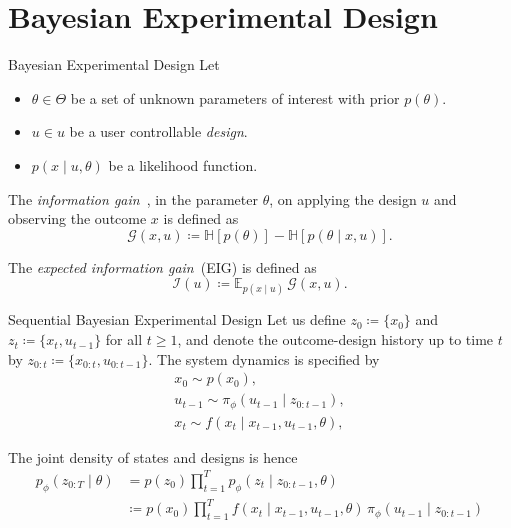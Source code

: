 \documentclass[10pt, aspectratio=1610]{beamer}
\begin{document}
    \section{Bayesian Experimental Design}
    \begin{frame}{Bayesian Experimental Design}
      Let
      \begin{itemize}
        \item $\theta \in \Theta$ be a set of unknown parameters of interest with prior $p(\theta)$.
        \item $u \in u$ be a user controllable \emph{design}.
        \item $p(x \mid u, \theta)$ be a likelihood function.
      \end{itemize}
      
      \pause
      \begin{definition}
        The \emph{information gain}~\citep[IG,][]{lindley1956measure}, in the parameter $\theta$, on applying the design $u$ and observing the outcome $x$ is defined as
        \begin{equation}\label{eq:ig_single_experiment}
          \mathcal{G}(x, u) \coloneq \mathbb{H}[p(\theta)] - \mathbb{H}[p(\theta\mid x, u)].
        \end{equation}
      \end{definition}

      \pause
      \begin{definition}
        The \emph{expected information gain}~(EIG) is defined as
        \begin{equation}
          \mathcal{I}(u) \coloneq \mathbb{E}_{p(x \mid u)} \, \mathcal{G}(x, u).
        \end{equation}
      \end{definition}
    \end{frame}

    \begin{frame}{Sequential Bayesian Experimental Design}
      Let us define $z_0 \coloneq \{x_0\}$ and $z_{t} \coloneq \{x_t, u_{t-1}\}$ for all $t \geq 1$, and denote the outcome-design history up to time $t$ by $z_{0:t} \coloneq \{x_{0:t}, u_{0:t-1}\}$. The system dynamics is specified by
      \begin{gather}
        x_0 \sim p(x_0), \\
        u_{t-1} \sim \pi_\phi(u_{t-1} \mid z_{0:t-1}), \\
        x_t \sim f(x_t \mid x_{t-1}, u_{t-1}, \theta),
      \end{gather}
      \pause

      \vspace{0.2cm}
      The joint density of states and designs is hence
      \begin{align}\label{eq:joint_density}
        p_{\phi}(z_{0:T} \mid \theta) &= p(z_{0}) \prod_{t=1}^T p_{\phi}(z_{t} \mid z_{0:t-1}, \theta) \\
        &\coloneq p(x_0) \prod_{t=1}^T f(x_t \mid x_{t-1}, u_{t-1}, \theta) \, \pi_\phi(u_{t-1} \mid z_{0:t-1})
      \end{align}
    \end{frame}
\end{document}
